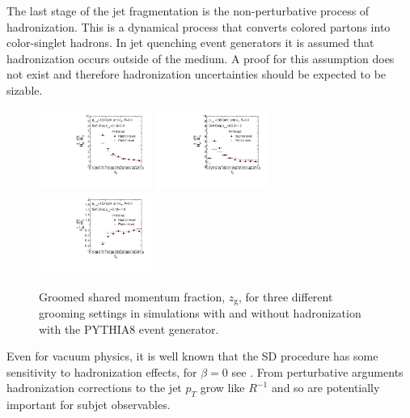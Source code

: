 The last stage of the jet fragmentation is the non-perturbative process of hadronization. This is a dynamical process that converts colored partons into color-singlet hadrons. In jet quenching event generators it is assumed that hadronization occurs outside of the medium. A proof for this assumption does not exist and therefore hadronization uncertainties should be expected to be sizable. 

\begin{figure}[th]
\centering
\includegraphics[width=0.33\textwidth]{figures/SDGen/ZgPytHadVsPartBeta00Z01.pdf}%
\includegraphics[width=0.33\textwidth]{figures/SDGen/ZgPytHadVsPartBeta15Z05.pdf}%
\includegraphics[width=0.33\textwidth]{figures/SDGen/ZgPytHadVsPartBetam1Z01.pdf}%
\caption{Groomed shared momentum fraction, $z_{\mathrm{g}}$, for three different grooming settings in simulations with and without hadronization with the PYTHIA8 event generator.}
\label{fig:SDGenZGHadVsPart}
\end{figure}
Even for vacuum physics, it is well known that the SD procedure has some sensitivity to hadronization effects, for $\beta = 0$ see \cite{Dasgupta:2015yua}.
From perturbative arguments hadronization corrections to the jet $p_{T}$ grow like $R^{-1}$ \cite{Dasgupta:2007wa} and
so are potentially important for subjet observables.
